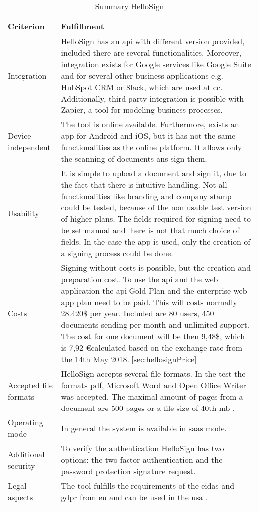 	\begin{longtable}{|p{4cm}|p{10cm}|} \hline
		Criterion & Fulfillment \\ \hline
		Integration & HelloSign has an \gls{api} with different version provided, included there are several functionalities. Moreover, integration exists for Google services like Google Suite and for several other business applications e.g. HubSpot CRM or Slack, which are used at \gls{cc}. Additionally, third party integration is possible with Zapier, a tool for modeling business processes. \parencite{hellosign2018integration,hellosign2018api}\\ \hline
		Device independent & The tool is online available. Furthermore, exists an \gls{app} for Android and iOS, but it has not the same functionalities as the online platform. It allows only the scanning of documents ans sign them. \parencite{hellosign2018legal}\\ \hline
		Usability & It is simple to upload a document and sign it, due to the fact that there is intuitive handling. Not all functionalities like branding and company stamp could be tested, because of the non usable test version of higher plans. The fields required for signing need to be set manual and there is not that much choice of fields. In the case the \gls{app} is used, only the creation of a signing process could be done.\\ \hline
		Costs &  Signing without costs is possible, but the creation and preparation cost. To use the \gls{api} and the web application the \gls{api} Gold Plan and the enterprise web app plan need to be paid. This will costs normally 28.420\$ per year. Included are 80 users, 450 documents sending per month and unlimited support. The cost for one document will be then 9,48\$, which is 7,92 \euro calculated based on the exchange rate from the 14th May 2018.  \ref{sec:hellosignPrice} \\ \hline
		Accepted file formats & HelloSign accepts several file formats. In the test the formats \gls{pdf}, Microsoft Word and Open Office Writer was accepted. The maximal amount of pages from a document are 500 pages or a file size of 40th \gls{mb} \parencite{hellosign2018documents}.\\ \hline
		Operating mode & In general the system is available in \gls{saas} mode. \parencite{hellosign2018features} \\ \hline
		Additional security & To verify the authentication HelloSign has two options: the two-factor authentication and the password protection signature request.\parencite{hellosign2018security} \\ \hline
		Legal aspects & The tool fulfills the requirements of the \gls{eidas} and \gls{gdpr} from \gls{eu} and can be used in the \gls{usa} \parencite{hellosign2018legal,hellosign2018compliance}. \\ \hline
	\caption{Summary HelloSign}
	\label{tab:hellosign}
	\end{longtable}


